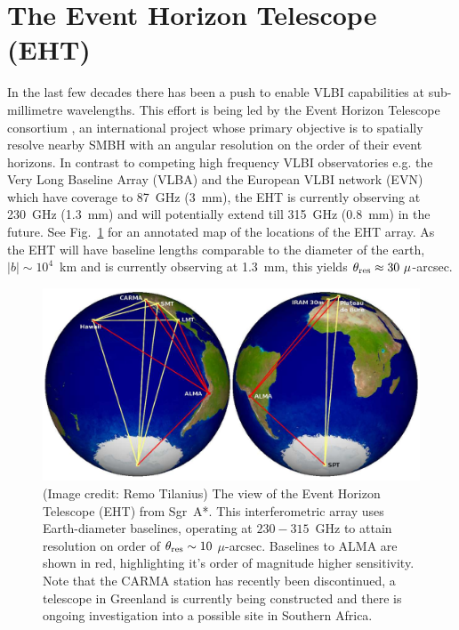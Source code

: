 \section{The Event Horizon Telescope (EHT)}

In the last few decades there has been a push to enable VLBI capabilities at sub-millimetre wavelengths. This effort is being led by the Event Horizon Telescope consortium \citep[(EHT),][]{Doeleman_2010}, an international project whose primary objective is to spatially resolve nearby SMBH with an angular resolution on the order of their event horizons. In contrast to competing high frequency VLBI observatories e.g. the Very Long Baseline Array (VLBA) and the European VLBI network (EVN) which have coverage to 87~GHz (3~mm), the EHT is currently observing at 230~GHz (1.3~mm) and will potentially extend till 315~GHz (0.8~mm) in the future. See Fig.~\ref{fig:eht_globe} for an annotated map of the locations of the EHT array. As the EHT will have baseline lengths comparable to the diameter of the earth, $|b| \sim 10^4$~km and is currently observing at 1.3~mm, this yields $\theta_{\rm res} \approx 30\ \mu$-arcsec.

\begin{figure}
\begin{center}
\includegraphics[width=0.8\columnwidth]{Images/eht_globe}
\caption{(Image credit: Remo Tilanius) The view of the Event Horizon Telescope (EHT) from Sgr~A*. This interferometric array uses Earth-diameter baselines, operating at $230-315$~GHz to attain resolution on order of $\theta_{\rm res} \sim 10$ $\mu$-arcsec. Baselines to ALMA are shown in red, highlighting it's order of magnitude higher sensitivity. Note that the CARMA station has recently been discontinued, a telescope in Greenland is currently being constructed and there is ongoing investigation into a possible site in Southern Africa.\label{fig:eht_globe}%
}
\end{center}
\end{figure}


